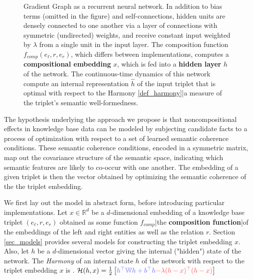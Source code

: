 \documentclass[a4paper,10pt]{article}
\def\layersep{1.5cm}
\begin{document}
\begin{figure}[!h]
\caption{Gradient Graph as a recurrent neural network. In addition to bias terms (omitted in the figure) and self-connections, hidden units are densely connected to one another via a layer of connections with symmetric (undirected) weights, and receive constant input weighted by $\lambda$ from a single unit in the input layer. The composition function $f_{comp}(e_\ell,r,e_r)$, which differs between implementations, computes a \textbf{compositional embedding} $x$, which is fed into a \textbf{hidden layer} $h$ of the network. The continuous-time dynamics of this network compute an internal representation $\hat{h}$ of the input triplet that is optimal with respect to the Harmony \ref{def_harmony}|a measure of the triplet's semantic well-formedness. } \label{fig_network_diagram}
\end{figure}

The hypothesis underlying the approach we propose is that noncompositional effects in knowledge base data can be modeled by subjecting candidate facts to a process of optimization with respect to a set of learned semantic coherence conditions. These semantic coherence conditions, encoded in a symmetric matrix, map out the covariance structure of the semantic space, indicating which semantic features are likely to co-occur with one another. The embedding of a given triplet is then the vector obtained by optimizing the semantic coherence of the the triplet embedding. 

We first lay out the model in abstract form, before introducing particular implementations. Let $x \in \mathbb{R}^d$ be a $d$-dimensional embedding of a knowledge base triplet $(e_\ell, r, e_r)$ obtained as some function $f_{comp}$|the \textbf{composition function}|of the embeddings of the left and right entities as well as the relation $r$. Section \ref{sec_models} provides several models for constructing the triplet embedding $x$. Also, let $h$ be a $d$-dimensional vector giving the internal ("hidden") state of the network. The \emph{Harmony} of an internal state $h$ of the network with respect to the triplet embedding $x$ is
\ex. {\small $\mathcal{H}(h,x) = \frac{1}{2} \left[ {\color{blue!60} h^\top \mathbb{W} h + b^\top h } {\color{red!70} - \lambda (h - x)^\top (h-x) } \right]$ } \label{def_harmony}
\end{document}
